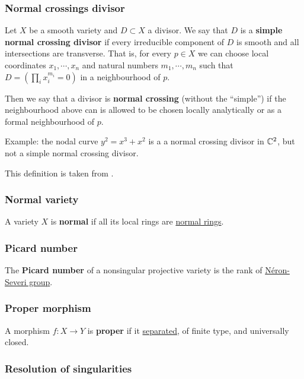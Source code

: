\documentclass[11pt, english]{article}
\begin{document}
\subsubsection{Normal crossings divisor}
\label{normalcrossingsdivisor}

Let $X$ be a smooth variety and $D \subset X$ a divisor. We say that $D$ is a \textbf{simple normal crossing divisor} if every irreducible component of $D$ is smooth and all intersections are transverse. That is, for every $p \in X$ we can choose local coordinates $x_1,\cdots,x_n$ and natural numbers $m_1,\cdots,m_n$ such that $D=\left( \prod_{i} x_i^{m_i} =0 \right)$ in a neighbourhood of $p$.

Then we say that a divisor is \textbf{normal crossing} (without the ``simple'') if the neighbourhood above can is allowed to be chosen locally analytically or as a formal neighbourhood of $p$.

Example: the nodal curve $y^2=x^3+x^2$ is a a normal crossing divisor in $\mathbb{C}^2$, but not a simple normal crossing divisor.

This definition is taken from \cite{kollar_resolution}. 


\subsubsection{Normal variety}
\label{normalvariety}
A variety $X$ is \textbf{normal} if all its local rings are \hyperref[normalring]{normal rings}.

\subsubsection{Picard number}
\label{picardnumber}

The \textbf{Picard number} of a nonsingular projective variety is the rank of \hyperref[neronseveri]{Néron-Severi group}.

\subsubsection{Proper morphism}
\label{proper}
A morphism $f:X \to Y$ is \textbf{proper} if it \hyperref[separated]{separated}, of finite type, and universally closed.

\subsubsection{Resolution of singularities}
\label{resolutionsing}
\end{document}
